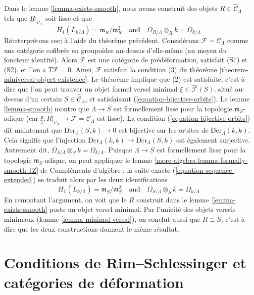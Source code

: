 \begin{example}
\label{example-smooth-continued}
Dans le lemme \ref{lemma-exists-smooth}, nous avons construit des objets
$R \in \widehat{\mathcal{C}}_\Lambda$ tels que
$\underline{R}|_{\mathcal{C}_\Lambda}$ soit lisse et que
$$
H_1(L_{k/\Lambda}) = \mathfrak m_R/\mathfrak m_R^2
\quad\text{and}\quad
\Omega_{R/\Lambda} \otimes_R k = \Omega_{k/\Lambda}
$$
Réinterprétons ceci à l'aide du théorème précédent. Considérons
$\mathcal{F} = \mathcal{C}_\Lambda$ comme une catégorie cofibrée en
groupoïdes au-dessus d'elle-même (au moyen du foncteur identité). Alors
$\mathcal{F}$ est une catégorie de prédéformation, satisfait (S1) et (S2), et
l'on a $T\mathcal{F} = 0$. Ainsi, $\mathcal{F}$ satisfait la condition (3) du
théorème \ref{theorem-miniversal-object-existence}. Le théorème implique que
(2) est satisfaite, c'est-à-dire que l'on peut trouver un objet formel versel
minimal $\xi \in \widehat{\mathcal{F}}(S)$, situé au-dessus d'un certain
$S \in \widehat{\mathcal{C}}_\Lambda$, et satisfaisant
(\ref{equation-bijective-orbits}). Le lemme \ref{lemma-smooth} montre que
$\Lambda \to S$ est formellement lisse pour la topologie
$\mathfrak m_S$-adique (car
$\underline{\xi} : \underline{R}|_{\mathcal{C}_\Lambda} \to
\mathcal{F} = \mathcal{C}_\Lambda$ est lisse). La condition
(\ref{equation-bijective-orbits}) dit maintenant que
$\text{Der}_\Lambda(S, k) \to 0$ est bijective sur les orbites de
$\text{Der}_\Lambda(k, k)$. Cela signifie que l'injection
$\text{Der}_\Lambda(k, k) \to \text{Der}_\Lambda(S, k)$ est également
surjective. Autrement dit,
$\Omega_{S/\Lambda} \otimes_S k = \Omega_{k/\Lambda}$. Puisque
$\Lambda \to S$ est formellement lisse pour la topologie
$\mathfrak m_S$-adique, on peut appliquer le lemme
\ref{more-algebra-lemma-formally-smooth-JZ} de Compléments d'algèbre ; la suite
exacte (\ref{equation-sequence-extended}) se traduit alors par les deux identifications
$$
H_1(L_{k/\Lambda}) = \mathfrak m_S/\mathfrak m_S^2
\quad\text{and}\quad
\Omega_{S/\Lambda} \otimes_S k = \Omega_{k/\Lambda}
$$
En remontant l'argument, on voit que le $R$ construit dans le lemme
\ref{lemma-exists-smooth} porte un objet versel minimal. Par l'unicité des
objets versels minimaux (lemme \ref{lemma-minimal-versal}), on conclut aussi
que $R \cong S$, c'est-à-dire que les deux constructions donnent le même
résultat.
\end{example}







\section{Conditions de Rim--Schlessinger et catégories de déformation}
\label{section-RS-condition}

